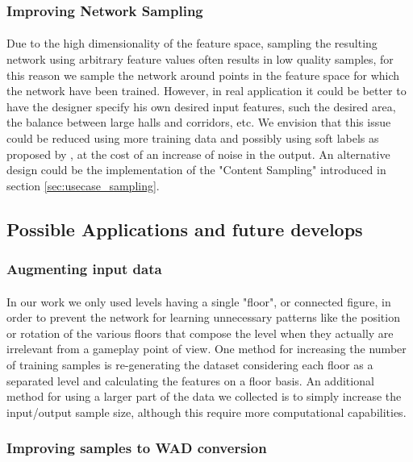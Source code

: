\subsubsection{Improving Network Sampling}
\label{sec:sampling}
\paragraph{} Due to the high dimensionality of the feature space, sampling the resulting network using arbitrary feature values often results in low quality samples, for this reason we sample the network around points in the feature space for which the network have been trained. However, in real application it could be better to have the designer specify his own desired input features, such the desired area, the balance between large halls and corridors, etc. We envision that this issue could be reduced using more training data and possibly using soft labels as proposed by \cite{improved_gan}, at the cost of an increase of noise in the output. An alternative design could be the implementation of the "Content Sampling" introduced in section \ref{sec:usecase_sampling}.

\subsection{Possible Applications and future develops}
\subsubsection{Augmenting input data}
\label{sec:data-augmentation}
\paragraph{} In our work we only used levels having a single "floor", or connected figure, in order to prevent the network for learning unnecessary patterns like the position or rotation of the various floors that compose the level when they actually are irrelevant from a gameplay point of view. One method for increasing the number of training samples is re-generating the dataset considering each floor as a separated level and calculating the features on a floor basis. An additional method for using a larger part of the data we collected is to simply increase the input/output sample size, although this require more computational capabilities. 

\subsubsection{Improving samples to WAD conversion}
